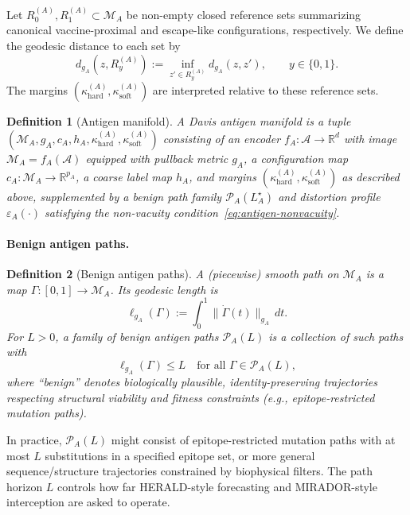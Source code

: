 \documentclass[11pt]{article}
\newcommand{\M}{\mathcal{M}}
\newcommand{\Pcal}{\mathcal{P}}
\newcommand{\Acal}{\mathcal{A}}
\newtheorem{definition}{Definition}
\begin{document}
Let $R^{(A)}_0, R^{(A)}_1 \subset \M_A$ be non-empty closed reference sets summarizing canonical vaccine-proximal and escape-like configurations, respectively. We define the geodesic distance to each set by
\[
  d_{g_A}(z, R^{(A)}_y) := \inf_{z' \in R^{(A)}_y} d_{g_A}(z, z'), \qquad y \in \{0,1\}.
\]
The margins $(\kappa^{(A)}_{\mathrm{hard}}, \kappa^{(A)}_{\mathrm{soft}})$ are interpreted relative to these reference sets.

\begin{definition}[Antigen manifold]
\label{def:antigen-manifold}
A \emph{Davis antigen manifold} is a tuple $(\M_A, g_A, c_A, h_A, \kappa^{(A)}_{\mathrm{hard}}, \kappa^{(A)}_{\mathrm{soft}})$ consisting of an encoder $f_A : \Acal \to \mathbb{R}^d$ with image $\M_A = f_A(\Acal)$ equipped with pullback metric $g_A$, a configuration map $c_A : \M_A \to \mathbb{R}^{p_A}$, a coarse label map $h_A$, and margins $(\kappa^{(A)}_{\mathrm{hard}}, \kappa^{(A)}_{\mathrm{soft}})$ as described above, supplemented by a benign path family $\Pcal_A(L_A^\star)$ and distortion profile $\varepsilon_A(\cdot)$ satisfying the non-vacuity condition~\eqref{eq:antigen-nonvacuity}.
\end{definition}

\paragraph{Benign antigen paths.}
\begin{definition}[Benign antigen paths]
\label{def:benign-antigen-paths}
\label{def:mirror-paths}
A (piecewise) smooth path on $\M_A$ is a map $\Gamma : [0,1] \to \M_A$. Its geodesic length is
\[
  \ell_{g_A}(\Gamma) := \int_0^1 \bigl\|\dot{\Gamma}(t)\bigr\|_{g_A} \, dt.
\]
For $L > 0$, a family of \emph{benign antigen paths} $\Pcal_A(L)$ is a collection of such paths with
\[
  \ell_{g_A}(\Gamma) \le L \quad \text{for all } \Gamma \in \Pcal_A(L),
\]
where ``benign'' denotes biologically plausible, identity-preserving trajectories respecting structural viability and fitness constraints (e.g., epitope-restricted mutation paths).
\end{definition}

In practice, $\Pcal_A(L)$ might consist of epitope-restricted mutation paths with at most $L$ substitutions in a specified epitope set, or more general sequence/structure trajectories constrained by biophysical filters. The path horizon $L$ controls how far HERALD-style forecasting and MIRADOR-style interception are asked to operate.
\end{document}
